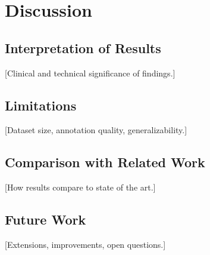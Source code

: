\chapter{Discussion}

\section{Interpretation of Results}
[Clinical and technical significance of findings.]

\section{Limitations}
[Dataset size, annotation quality, generalizability.]

\section{Comparison with Related Work}
[How results compare to state of the art.]

\section{Future Work}
[Extensions, improvements, open questions.]
